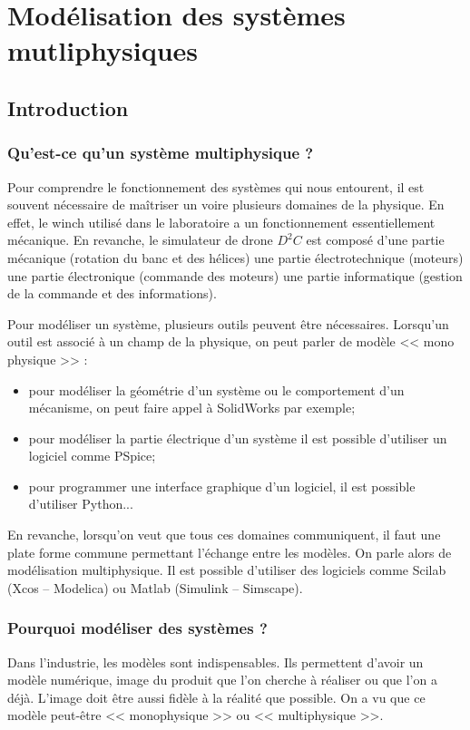 \setchapterpreamble[u]{\margintoc}
\chapter{Modélisation des systèmes mutliphysiques}


\section{Introduction}
\subsection{Qu'est-ce qu'un système multiphysique ?}

Pour comprendre le fonctionnement des systèmes qui nous entourent, il est souvent nécessaire de maîtriser un voire plusieurs domaines de la physique. En effet, le winch utilisé dans le laboratoire a un fonctionnement essentiellement mécanique. En revanche, le simulateur de drone $D^2C$ est composé d'une partie mécanique (rotation du banc et des hélices) une partie électrotechnique (moteurs) une partie électronique (commande des moteurs) une partie informatique (gestion de la commande et des informations). 

Pour modéliser un système, plusieurs outils peuvent être nécessaires. Lorsqu'un outil est associé à un champ de la physique, on peut parler de modèle << mono physique >> :
\begin{itemize}
\item pour modéliser la géométrie d'un système ou le comportement d'un mécanisme, on peut faire appel à SolidWorks par exemple;
\item pour modéliser la partie électrique d'un système il est possible d'utiliser un logiciel comme PSpice;
\item pour programmer une interface graphique d'un logiciel, il est possible d'utiliser Python...
\end{itemize}

En revanche, lorsqu'on veut que tous ces domaines communiquent, il faut une plate forme commune permettant l'échange entre les modèles. On parle alors de modélisation multiphysique. Il est possible d'utiliser des logiciels comme Scilab (Xcos -- Modelica) ou Matlab (Simulink -- Simscape). 



\subsection{Pourquoi modéliser des systèmes ?}
Dans l'industrie, les modèles sont indispensables. Ils permettent d'avoir un modèle numérique, image du produit que l'on cherche à réaliser ou que l'on a déjà. L'image doit être aussi fidèle à la réalité que possible. On a vu que ce modèle peut-être << monophysique >> ou << multiphysique >>. 

